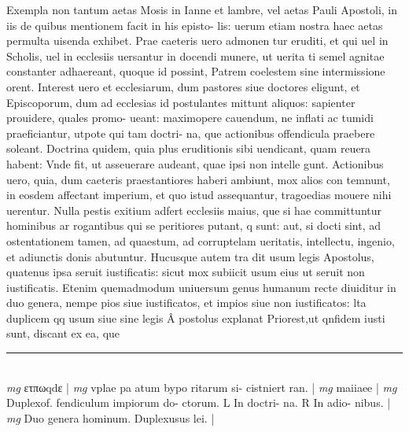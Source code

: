 \documentclass{article}
\begin{document}
\begin{pages}
Exempla non tantum aetas Mosis in Ianne et lambre, vel aetas Pauli Apostoli, in iis de quibus mentionem facit in his episto- lis: uerum etiam nostra haec aetas permulta uisenda exhibet. Prae caeteris uero admonen tur eruditi, et qui uel in Scholis, uel in ecclesiis uersantur in docendi munere, ut uerita ti semel agnitae constanter adhaereant, quoque  id possint, Patrem coelestem sine intermissione orent. Interest uero et ecclesiarum, dum pastores siue doctores eligunt, et Episcoporum, dum ad ecclesias id postulantes mittunt aliquos: sapienter prouidere, quales promo- ueant: maximopere cauendum, ne inflati ac tumidi praeficiantur, utpote qui tam doctri- na, que  actionibus offendicula praebere soleant. Doctrina quidem, quia plus eruditionis sibi uendicant, quam reuera habent: Vnde fit, ut asseuerare audeant, quae ipsi non intelle gunt. Actionibus uero, quia, dum caeteris praestantiores haberi ambiunt, mox alios con temnunt, in eosdem affectant imperium, et quo istud assequantur, tragoedias mouere nihi uerentur. Nulla pestis exitium adfert ecclesiis maius, que  si hae committuntur hominibus ar rogantibus  qui se peritiores putant, q sunt: aut, si docti sint, ad ostentationem tamen, ad quaestum, ad corruptelam ueritatis, intellectu, ingenio, et adiunctis donis abutuntur. Hucusque  autem tra dit usum legis Apostolus, quatenus ipsa seruit iustificatis: sicut mox subiicit usum eius ut seruit non iustificatis. Etenim quemadmodum uniuersum genus humanum recte diuiditur in duo genera, nempe pios siue iustificatos, et impios siue non iustificatos: lta duplicem qq usum siue sine legis Â postolus explanat Priorest,ut qnfidem iusti sunt, discant ex ea, que  \pend
\vspace{0.5cm}\noindent
\vspace{0.2cm}\rule{1cm}{0.2pt}\\ 
\hspace{0.2cm}\textit{mg}
\footnotesize ετπωqdε 
\normalsize| 
\hspace{0.2cm}\textit{mg}
\footnotesize vplae pa atum bypo ritarum si- cistniert ran. 
\normalsize| 
\hspace{0.2cm}\textit{mg}
\footnotesize maiiaee 
\normalsize| 
\hspace{0.2cm}\textit{mg}
\footnotesize Duplexof. fendiculum impiorum do- ctorum. L In doctri- na. R In adio- nibus. 
\normalsize| 
\hspace{0.2cm}\textit{mg}
\footnotesize Duo genera hominum. Duplexusus lei. 
\normalsize| 

\end{pages}
\end{document}
